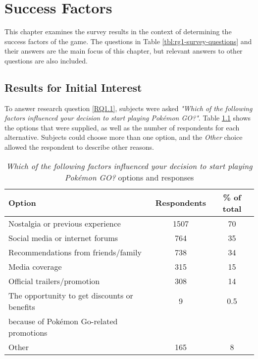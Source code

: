 
\chapter{Success Factors}
\label{chapter:player-study-success-factors}

This chapter examines the survey results in the context of determining the success factors of the game. The questions in Table \ref{tbl:rg1-survey-questions} and their answers are the main focus of this chapter, but relevant answers to other questions are also included.

\section{Results for Initial Interest}
\label{sec:success-factors-initial-interest-results}

To answer research question \ref{RQ1.1}, subjects were asked \emph{"Which of the following factors influenced your decision to start playing Pokémon GO?"}. Table \ref{tbl:initial-interest-options} shows the options that were supplied, as well as the number of respondents for each alternative. Subjects could choose more than one option, and the \emph{Other} choice allowed the respondent to describe other reasons.

\begin{table}[h]
	\caption{\emph{Which of the following factors influenced your decision to start playing Pokémon GO?} options and responses}
	\centering
	\label{tbl:initial-interest-options}
	\begin{tabular}{|l|c|c|}
		\hline
		\textbf{Option} & \textbf{Respondents} & \textbf{\% of total}\\
		\hline\hline
		Nostalgia or previous experience & 1507 & 70\\\hline
		Social media or internet forums & 764 & 35\\\hline
		Recommendations from friends/family & 738 & 34\\\hline
		Media coverage & 315 & 15\\\hline
		Official trailers/promotion & 308 & 14\\\hline
		The opportunity to get discounts or benefits & 9 & 0.5\\ because of Pokémon Go-related promotions && \\\hline
		Other & 165 & 8\\\hline
	\end{tabular}
\end{table}

